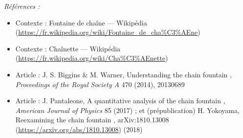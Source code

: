 \documentclass[11pt]{article}
\newenvironment{refs}{\par\small\noindent\emph{Références :}\begin{itemize}\setlength\itemsep{0pt}}{\end{itemize}\normalsize}
\begin{document}
\begin{refs}
\item Contexte : Fontaine de chaîne --- Wikipédia (\url{https://fr.wikipedia.org/wiki/Fontaine_de_cha%C3%AEne})
\item Contexte : Chaînette --- Wikipédia (\url{https://fr.wikipedia.org/wiki/Cha%C3%AEnette})
\item Article : J. S. Biggins \& M. Warner, \og{} Understanding the chain fountain \fg{}, \textit{Proceedings of the Royal Society A} 470 (2014), 20130689
\item Article : J. Pantaleone, \og{} A quantitative analysis of the chain fountain \fg{}, \textit{American Journal of Physics} 85 (2017) ; et (prépublication) H. Yokoyama, \og{} Reexamining the chain fountain \fg{}, arXiv:1810.13008 (\url{https://arxiv.org/abs/1810.13008}) (2018)
\end{refs}

\bigskip
\end{document}
